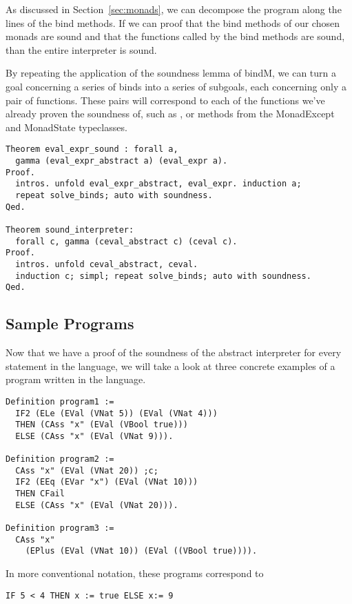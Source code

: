 As discussed in Section~\ref{sec:monads}, we can decompose the program along
the lines of the bind methods. If we can proof that the bind methods of our
chosen monads are sound and that the functions called by the bind methods are
sound, than the entire interpreter is sound. 

By repeating the application of the soundness lemma of bindM, 
we can turn a goal concerning a series of binds into a series of subgoals, each
concerning only a pair of functions. These pairs will correspond to each of the
functions we've already proven the soundness of, such as , or
methods from the MonadExcept and MonadState typeclasses.

\begin{verbatim}
Theorem eval_expr_sound : forall a,
  gamma (eval_expr_abstract a) (eval_expr a).
Proof.
  intros. unfold eval_expr_abstract, eval_expr. induction a; 
  repeat solve_binds; auto with soundness. 
Qed.

Theorem sound_interpreter:
  forall c, gamma (ceval_abstract c) (ceval c).
Proof.
  intros. unfold ceval_abstract, ceval. 
  induction c; simpl; repeat solve_binds; auto with soundness.
Qed.
\end{verbatim}

\subsection{Sample Programs}
Now that we have a proof of the soundness of the abstract interpreter for every
statement in the language, we will take a look at three concrete examples of a
program written in the language. 

\begin{verbatim}
Definition program1 := 
  IF2 (ELe (EVal (VNat 5)) (EVal (VNat 4))) 
  THEN (CAss "x" (EVal (VBool true))) 
  ELSE (CAss "x" (EVal (VNat 9))).

Definition program2 :=
  CAss "x" (EVal (VNat 20)) ;c;
  IF2 (EEq (EVar "x") (EVal (VNat 10)))
  THEN CFail
  ELSE (CAss "x" (EVal (VNat 20))).

Definition program3 :=
  CAss "x" 
  	(EPlus (EVal (VNat 10)) (EVal ((VBool true)))).
\end{verbatim}

In more conventional notation, these programs correspond to

\begin{lstlisting}
IF 5 < 4 THEN x := true ELSE x:= 9
\end{lstlisting}

